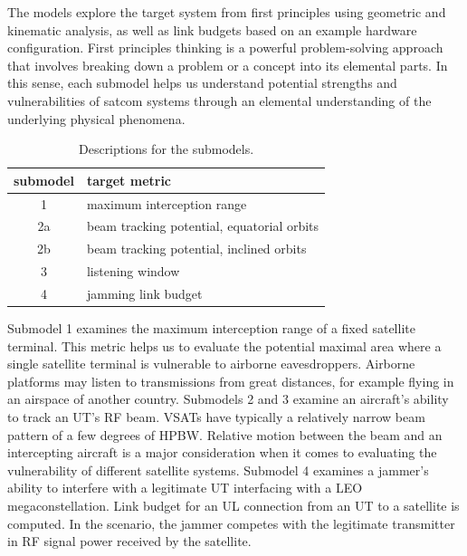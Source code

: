 \documentclass[english, 12pt, a4paper, elec, utf8, a-1b, online]{aaltothesis}
\begin{document}
The models explore the target system from first principles using geometric and kinematic analysis, as well as link budgets based on an example hardware configuration.
First principles thinking is a powerful problem-solving approach that involves breaking down a problem or a concept into its elemental parts.
In this sense, each submodel helps us understand potential strengths and vulnerabilities of satcom systems through an elemental understanding of the underlying physical phenomena.

\begin{table}[h]
  \centering
  \caption{Descriptions for the submodels.}
  \begin{tabular}{@{}cl@{}}
  \toprule
  \multicolumn{1}{l}{submodel}  & target metric                              \\ \midrule
  1                             & maximum interception range                 \\
  2a                            & beam tracking potential, equatorial orbits \\
  2b                            & beam tracking potential, inclined orbits   \\
  3                             & listening window                           \\
  4                             & jamming link budget                        \\ \bottomrule
  \end{tabular}
  \label{table-submodel-descriptions}
\end{table}

Submodel 1 examines the maximum interception range of a fixed satellite terminal.
This metric helps us to evaluate the potential maximal area where a single satellite terminal is vulnerable to airborne eavesdroppers.
Airborne platforms may listen to transmissions from great distances, for example flying in an airspace of another country.
Submodels 2 and 3 examine an aircraft's ability to track an UT's RF beam.
VSATs have typically a relatively narrow beam pattern of a few degrees of HPBW.
Relative motion between the beam and an intercepting aircraft is a major consideration when it comes to evaluating the vulnerability of different satellite systems.
Submodel 4 examines a jammer's ability to interfere with a legitimate UT interfacing with a LEO megaconstellation.
Link budget for an UL connection from an UT to a satellite is computed.
In the scenario, the jammer competes with the legitimate transmitter in RF signal power received by the satellite.
\end{document}
